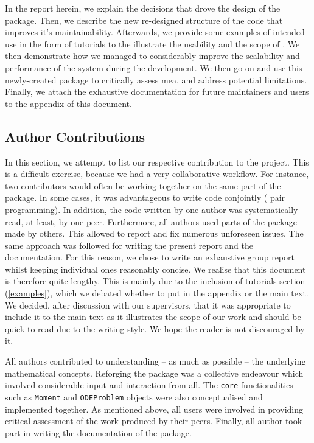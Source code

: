 In the report herein, we explain the decisions that drove the design of the package.
Then, we describe the new re-designed structure of the code that improves it's maintainability.
Afterwards, we provide some examples of intended use in the form of tutorials to the illustrate the usability and the scope of \means.
We then demonstrate how we managed to considerably improve the scalability and performance of the system during the development.
We then go on and use this newly-created package to critically assess \gls{mea}, and address potential limitations.
Finally, we attach the exhaustive documentation for future maintainers and users to the appendix of this document.

\subsection{Author Contributions}
In this section, we attempt to list our respective contribution to the project.
This is a difficult exercise, because we had a very collaborative workflow.
For instance,  two contributors would often be working together on the same part of the package.
In some cases, it was advantageous to write code conjointly (\ie{} pair programming).
In addition, the code written by one author was systematically read, at least, by one peer.
Furthermore,  all authors used  parts of the package made by others.
This allowed to report and fix numerous unforeseen issues.
The same approach was followed for writing the present report and the documentation.
For this reason, we chose to write an exhaustive group report whilst keeping individual ones reasonably concise. 
We realise that this document is therefore quite lengthy.
This is mainly due to the inclusion of tutorials section (\autoref{examples}),
which we debated whether to put in the appendix or the main text. 
We decided, after discussion with our supervisors, that it was appropriate to include it to the main text as it illustrates the scope of our work and should be quick to read due to the writing style. We hope the reader is not discouraged by it.

All authors contributed to understanding -- as much as possible -- the underlying mathematical concepts.
Reforging the package was a collective endeavour which involved considerable input and interaction from all.
The \texttt{core} functionalities such as \texttt{Moment} and \texttt{ODEProblem} objects were also conceptualised and implemented together.  
As mentioned above, all users were involved in providing critical assessment of the work produced by their peers.
Finally, all author took part in writing the documentation of the package.

